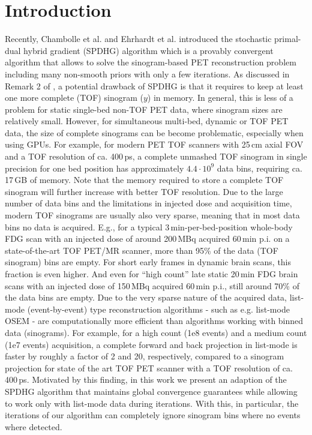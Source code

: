 \documentclass[10pt,twocolumn,twoside,letterpaper]{IEEEtran}
\begin{document}
\section{Introduction}

Recently, Chambolle et al. \cite{Chambolle2018} and  Ehrhardt et al. \cite{Ehrhardt2019} introduced 
the stochastic primal-dual hybrid gradient (SPDHG) algorithm which is a provably convergent algorithm
that allows to solve the sinogram-based PET reconstruction problem including many non-smooth priors with
only a few iterations.
As discussed in Remark 2 of \cite{Ehrhardt2019}, a potential drawback of SPDHG is that it requires
to keep at least one more complete (TOF) sinogram ($y$) in memory. 
In general, this is less of a problem for static single-bed non-TOF PET data, where sinogram sizes
are relatively small.
However, for simultaneous multi-bed, dynamic or TOF PET data, the size of complete sinograms
can be become problematic, especially when using GPUs.
For example, for modern PET TOF scanners with 25\,cm axial FOV and a TOF resolution of ca. 400\,ps, 
a complete unmashed TOF sinogram in single precision for one bed position 
has approximately $4.4\cdot10^9$ data bins, requiring ca. 17\,GB of memory.
Note that the memory required to store a complete TOF sinogram will further 
increase with better TOF resolution.
Due to the large number of data bins and the limitations in injected dose and acquisition time,
modern TOF sinograms are usually also very sparse, meaning that in most data bins no data is
acquired.
E.g., for a typical 3\,min-per-bed-position whole-body FDG scan with an injected dose 
of around 200\,MBq acquired 60\,min p.i. on a state-of-the-art TOF PET/MR scanner, 
more than 95\% of the data (TOF sinogram) bins are empty.
For short early frames in dynamic brain scans, this fraction is even higher.
And even for ``high count'' late static 20\,min FDG brain scans with an injected dose of 150\,MBq
acquired 60\,min p.i., still around 70\% of the data bins are empty.
Due to the very sparse nature of the acquired data, list-mode (event-by-event) type
reconstruction algorithms - such as e.g. list-mode OSEM - are computationally more efficient
than algorithms working with binned data (sinograms).
For example, for a high count (1e8 events) and a medium count (1e7 events) acquisition, 
a complete forward and back projection in list-mode is faster by roughly a factor of 2 and 20,
respectively, compared to a sinogram projection for state of the art TOF PET scanner 
with a TOF resolution of ca. 400\,ps.
Motivated by this finding, 
in this work we present an adaption of the SPDHG algorithm that maintains global convergence guarantees while allowing to work only with list-mode data during iterations.
With this, in particular, the iterations of our algorithm can completely ignore sinogram bins where no events where detected.
\end{document}

